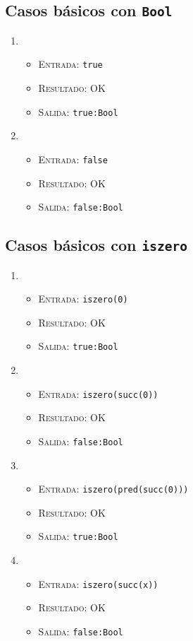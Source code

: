 \documentclass[11pt]{article}
\newcounter{savedenum}
\newcommand{\saveenum}{\setcounter{savedenum}{\theenumi}}
\newcommand{\loadenum}{\setcounter{enumi}{\thesavedenum}}
\begin{document}
\subsection{Casos básicos con \texttt{Bool}}
\begin{enumerate}
\loadenum
\item \begin{itemize}
    \item \textsc{Entrada:}   \verb|true|
    \item \textsc{Resultado:} OK
    \item \textsc{Salida:}    \verb|true:Bool|
    \end{itemize}
\item \begin{itemize}
    \item \textsc{Entrada:}   \verb|false|
    \item \textsc{Resultado:} OK
    \item \textsc{Salida:}    \verb|false:Bool| \\
    \end{itemize}
\saveenum
\end{enumerate}

\subsection{Casos básicos con \texttt{iszero}}
\begin{enumerate}
\loadenum
\item \begin{itemize}
    \item \textsc{Entrada:}   \verb|iszero(0)|
    \item \textsc{Resultado:} OK
    \item \textsc{Salida:}    \verb|true:Bool|
    \end{itemize}
\item \begin{itemize}
    \item \textsc{Entrada:}   \verb|iszero(succ(0))|
    \item \textsc{Resultado:} OK
    \item \textsc{Salida:}    \verb|false:Bool|
    \end{itemize}
\item \begin{itemize}
    \item \textsc{Entrada:}   \verb|iszero(pred(succ(0)))|
    \item \textsc{Resultado:} OK
    \item \textsc{Salida:}    \verb|true:Bool|
    \end{itemize}
\item \begin{itemize}
    \item \textsc{Entrada:}   \verb|iszero(succ(x))|
    \item \textsc{Resultado:} OK
    \item \textsc{Salida:}    \verb|false:Bool| \\
    \end{itemize}
\saveenum
\end{enumerate}
\end{document}
